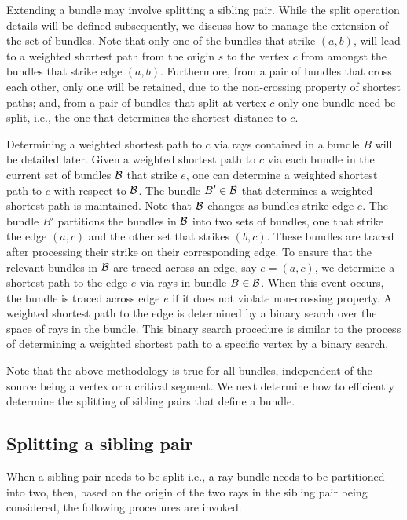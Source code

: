 \documentclass[11pt]{article}
\begin{document}
 Extending a bundle may involve splitting a sibling pair. 
 While the split operation details will be defined subsequently,
 we discuss how to manage the extension of the set of bundles. 
 Note that only one of the bundles that strike $(a,b)$, 
 will lead to a weighted shortest path from the origin $s$ to the vertex $c$ from amongst the bundles that strike edge $(a,b)$. 
Furthermore, from a pair of bundles that cross each other, only one will be retained, due to the non-crossing property of shortest paths; and, from a  pair of bundles that split at vertex $c$ only one bundle need be split, i.e., the one that determines the shortest distance to $c$.

 Determining a weighted shortest path to $c$ via rays contained in a bundle $B$ will be detailed later. 
 Given a weighted shortest path to $c$ via each bundle in the current set of bundles ${\cal B}$ that strike $e$, one can determine a weighted shortest path to $c$ with respect to ${\cal B}$. The bundle $B' \in {\cal B}$ that determines
 a weighted shortest path is maintained. Note that ${\cal B}$ changes as bundles strike edge $e$.
 The bundle $B'$ partitions the bundles in ${\cal B}$ into two sets of bundles, one that strike
the edge  $(a,c)$ and the other set that strikes  $(b,c)$. 
 These bundles are traced after processing their strike on their corresponding edge.
 To ensure that the relevant bundles in ${\cal B}$ are traced across an edge, say $e= (a,c)$, we determine a shortest path to the edge $e$ via rays in bundle $B \in {\cal B}$.
 When this event occurs, the bundle is traced across edge $e$ if it does not violate non-crossing property. 
 A weighted shortest path to the edge is determined by a binary search over the space of rays in the bundle. 
This binary search procedure is similar to the process of determining a weighted shortest path to a specific vertex by a binary search.


Note that the above  methodology is true for all bundles, independent of the source being a vertex or a critical segment.
We next determine how to efficiently determine the splitting of sibling pairs that define a bundle.

\subsection{Splitting a sibling pair}
\label{subsect:splitsibpair}

When a sibling pair needs to be split i.e.,  a ray bundle needs to be partitioned into two, then, based on the origin of the two rays in the sibling pair being considered, the following procedures are invoked.
\end{document}
